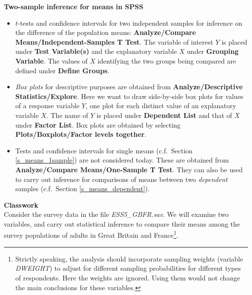 \vspace*{1ex}
\textbf{Two-sample inference for means in SPSS}
\vspace*{-2ex}
\begin{itemize}
\item
$t$-tests and confidence intervals for two independent samples for
inference on the difference of the population
means: \textbf{Analyze/Compare Means/Independent-Samples T Test}.
The variable of interest $Y$ is placed under \textbf{Test Variable(s)} and
the explanatory variable $X$ under \textbf{Grouping Variable}.
The values of $X$ identifying the two groups being compared
are defined under \textbf{Define Groups}.
\item
\emph{Box plots} for descriptive purposes are obtained from
\textbf{Analyze/Descriptive
Statistics/Explore}.
Here we want to draw side-by-side box plots for values of a
response variable $Y$, one plot for each distinct value of an
explanatory variable $X$. The name of $Y$ is placed under
\textbf{Dependent List} and that of $X$ under \textbf{Factor List}.
Box plots are obtained by
selecting \textbf{Plots/Boxplots/Factor levels
together}.
\item
Tests and confidence intervals for single means (c.f.\ Section \ref{s_means_1sample}) are not
considered today. These are obtained from
\textbf{Analyze/Compare Means/One-Sample T Test}. They
can also be used to carry out inference for
comparisons of means  between two \emph{dependent}  samples
(c.f.\ Section \ref{s_means_dependent}).
\end{itemize}

\textbf{Classwork}\\
Consider the survey data in the file \emph{ESS5\_GBFR.sav}. We will
examine two variables, and carry out statistical inference to
compare their means among
the survey populations of adults in
Great Britain and France\footnote{Strictly speaking, the analysis should
incorporate sampling weights (variable \emph{DWEIGHT}) to adjust for
different sampling probabilities for different types of respondents.
Here the weights are ignored. Using them would not change the main
conclusions for these variables.}.

